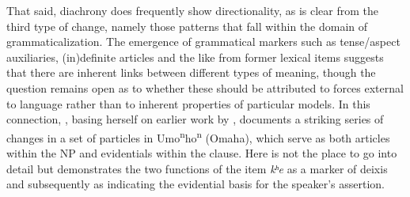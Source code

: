 \documentclass[output=paper,hidelinks]{langscibook}
\begin{document}
That said, diachrony does frequently show directionality, as is clear from the third type of change, namely those patterns that fall within the domain of grammaticalization. The emergence of grammatical markers such as tense/aspect auxiliaries, (in)definite articles and the like from former lexical items suggests that there are inherent links between different types of meaning, though the question remains open as to whether these should be attributed to forces external to language rather than to inherent properties of particular models. In this connection, \citet[Chapter~6]{Eschenberg2005}, basing herself on earlier work by \citet{Rankin2004}, documents a striking series of changes in a set of particles in Umo\textsuperscript{n}ho\textsuperscript{n} (Omaha), which serve as both articles within the NP and evidentials within the clause. Here is not the place to go into detail but  \citep[186]{Eschenberg2005} demonstrates the two functions of the item \textit{kʰ}\textit{e} as a marker of deixis and subsequently as indicating the evidential basis for the speaker's assertion.
\end{document}
